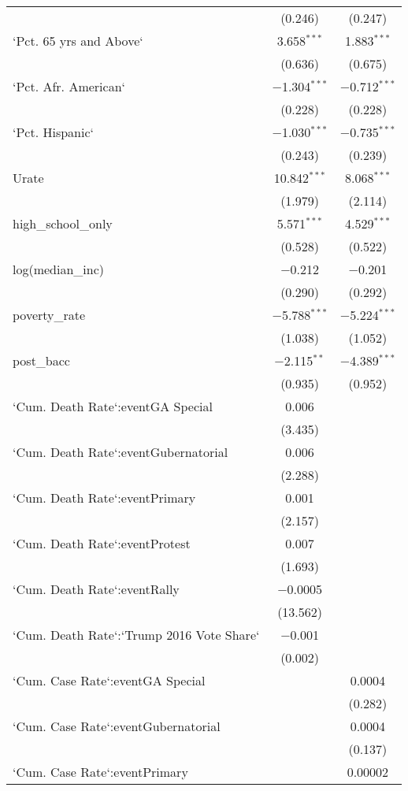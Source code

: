 \begin{table}[!htbp]
\begin{tabular}{@{\extracolsep{5pt}}lcc}
  & (0.246) & (0.247) \\ 
  `Pct. 65 yrs and Above` & 3.658$^{***}$ & 1.883$^{***}$ \\ 
  & (0.636) & (0.675) \\ 
  `Pct. Afr. American` & $-$1.304$^{***}$ & $-$0.712$^{***}$ \\ 
  & (0.228) & (0.228) \\ 
  `Pct. Hispanic` & $-$1.030$^{***}$ & $-$0.735$^{***}$ \\ 
  & (0.243) & (0.239) \\ 
  Urate & 10.842$^{***}$ & 8.068$^{***}$ \\ 
  & (1.979) & (2.114) \\ 
  high\_school\_only & 5.571$^{***}$ & 4.529$^{***}$ \\ 
  & (0.528) & (0.522) \\ 
  log(median\_inc) & $-$0.212 & $-$0.201 \\ 
  & (0.290) & (0.292) \\ 
  poverty\_rate & $-$5.788$^{***}$ & $-$5.224$^{***}$ \\ 
  & (1.038) & (1.052) \\ 
  post\_bacc & $-$2.115$^{**}$ & $-$4.389$^{***}$ \\ 
  & (0.935) & (0.952) \\ 
  `Cum. Death Rate`:eventGA Special & 0.006 &  \\ 
  & (3.435) &  \\ 
  `Cum. Death Rate`:eventGubernatorial & 0.006 &  \\ 
  & (2.288) &  \\ 
  `Cum. Death Rate`:eventPrimary & 0.001 &  \\ 
  & (2.157) &  \\ 
  `Cum. Death Rate`:eventProtest & 0.007 &  \\ 
  & (1.693) &  \\ 
  `Cum. Death Rate`:eventRally & $-$0.0005 &  \\ 
  & (13.562) &  \\ 
  `Cum. Death Rate`:`Trump 2016 Vote Share` & $-$0.001 &  \\ 
  & (0.002) &  \\ 
  `Cum. Case Rate`:eventGA Special &  & 0.0004 \\ 
  &  & (0.282) \\ 
  `Cum. Case Rate`:eventGubernatorial &  & 0.0004 \\ 
  &  & (0.137) \\ 
  `Cum. Case Rate`:eventPrimary &  & 0.00002 \\ 

\end{tabular}
\end{table}

